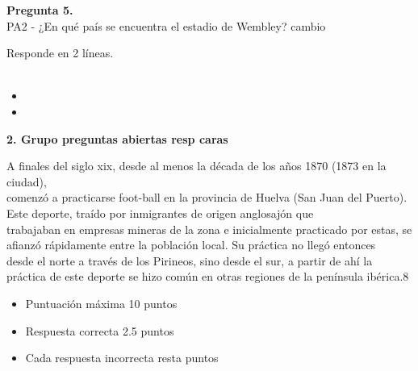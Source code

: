 \documentclass[12pt,a4paper,twoside]{article}
\newlength{\espacioRestanteMain}
\newcommand{\freespaceBox}{
	
	\setlength{\espacioRestanteMain}{\dimexpr\textheight-\pagetotal-\baselineskip-15pt\relax}
	
	\ifthenelse{\lengthtest{\espacioRestanteMain > 3cm}}{
		\noindent
		\colorbox{gray!10}{
		  \begin{minipage}[t][\espacioRestanteMain][c]{0.98\textwidth}
			\begin{center}
			  \fontsize{14}{21}\selectfont
			  \textcolor{gray!80}
			  {
			  NO UTILIZAR ESTA PARTE DE LA HOJA.\\
			  CONTINÚA A PARTIR DE LA SIGUIENTE\\
			  PÁGINA.
			  }
			\end{center}
		  \end{minipage}
		}
	}{}
}
\begin{document}
            \noindent\parbox[t]{\textwidth}
                {
                    \textbf{Pregunta 5.} \\
                    {
                        PA2 - ¿En qué país se encuentra el estadio de Wembley? cambio\\
                    }\par\noindent Responde en 2 líneas.\\
                \\
                }
                \begin{itemize}[left=1.5cm,label={}, itemsep=0.02em] 
                
                    \item
                
                    \item
                
                \end{itemize}
                \freespaceBox
            
\newpage
	    
        
        {\noindent\fontsize{14}{21}\selectfont\textbf{
            2. Grupo preguntas abiertas resp caras 
            }\\
        }
            
        
        {\noindent\begin{minipage}{\textwidth}
            {
                A finales del siglo xix, desde al menos la década de los años 1870 (1873 en la ciudad),\\comenzó a practicarse foot-ball en la provincia de Huelva (San Juan del Puerto). Este deporte, traído por inmigrantes de origen anglosajón que\\trabajaban en empresas mineras de la zona e inicialmente practicado por estas, se afianzó rápidamente entre la población local. Su práctica no llegó entonces\\desde el norte a través de los Pirineos, sino desde el sur, a partir de ahí la práctica de este deporte se hizo común en otras regiones de la península 
                ibérica.8\\
            }
        \end{minipage}
        }
        
        \begin{itemize}[left=1.5cm, itemsep=0.02em] 
            \item Puntuación máxima 10 puntos
            \item Respuesta correcta 2.5 puntos
            \item Cada respuesta incorrecta resta  puntos
        \end{itemize}
\end{document}
